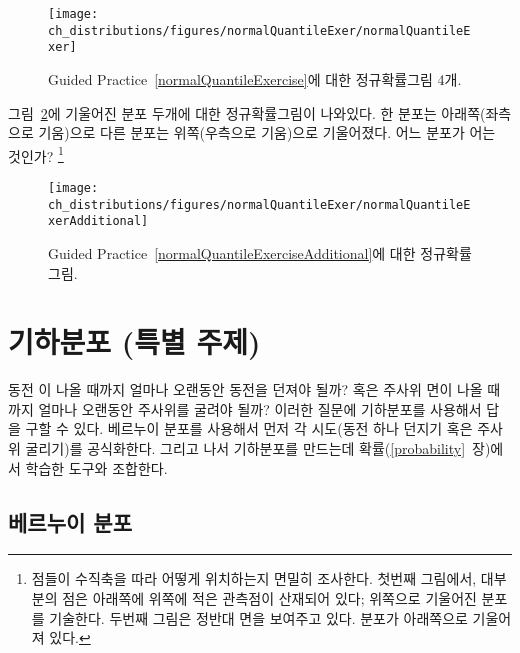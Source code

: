 \begin{figure}
\centering
\texttt{[image: ch\_distributions/figures/normalQuantileExer/normalQuantileExer]}
\caption{Guided Practice~\ref{normalQuantileExercise}에 대한 정규확률그림 4개.}
\label{normalQuantileExer}
\end{figure}


\begin{exercise} \label{normalQuantileExerciseAdditional}
그림~\ref{normalQuantileExerAdditional}에 기울어진 분포 두개에 대한 정규확률그림이 나와있다. 한 분포는 아래쪽(좌측으로 기움)으로 다른 분포는 위쪽(우측으로 기움)으로 기울어졌다. 어느 분포가 어는 것인가?
\footnote{
점들이 수직축을 따라 어떻게 위치하는지 면밀히 조사한다. 첫번째 그림에서, 대부분의 점은 아래쪽에 위쪽에 적은 관측점이 산재되어 있다; 위쪽으로 기울어진 분포를 기술한다. 두번째 그림은 정반대 면을 보여주고 있다. 분포가 아래쪽으로 기울어져 있다.}
\end{exercise}

\begin{figure}
\centering
\texttt{[image: ch\_distributions/figures/normalQuantileExer/normalQuantileExerAdditional]}
\caption{Guided Practice~\ref{normalQuantileExerciseAdditional}에 대한 정규확률그림.}
\label{normalQuantileExerAdditional}
\end{figure}




\section{기하분포 (특별 주제)}
\label{geomDist}

동전 이 나올 때까지 얼마나 오랜동안 동전을 던져야 될까? 혹은 주사위  면이 나올 때까지 얼마나 오랜동안 주사위를 굴려야 될까? 이러한 질문에 기하분포를 사용해서 답을 구할 수 있다. 베르누이 분포를 사용해서 먼저 각 시도(동전 하나 던지기 혹은 주사위 굴리기)를 공식화한다. 그리고 나서 기하분포를 만드는데 확률(\ref{probability}~장)에서 학습한 도구와 조합한다.

\subsection{베르누이 분포}
\label{bernoulli}

